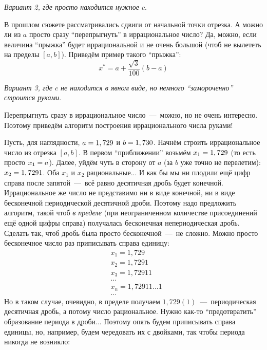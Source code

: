 \documentclass[a4paper,12pt]{article}
\begin{document}
\begin{solution}
    
    \emph{Вариант 2, где просто находится нужное $c$}.
    
    В прошлом сюжете рассматривались сдвиги от начальной точки отрезка.
    А можно ли из $a$ просто сразу ``перепрыгнуть'' в иррациональное число?
    Да, можно, если величина ``прыжка'' будет иррациональной и не очень большой (чтоб не вылететь на пределы $[a, b]$).
    Приведём пример такого ``прыжка'':
    \[
      x^* = a + \frac{\sqrt{3}}{100} (b - a)
    \]
    
    
    \emph{Вариант 3, где $c$ не находится в явном виде, но немного ``замороченно'' строится руками}.
    
    Перепрыгнуть сразу в иррациональное число~---~можно, но не очень интересно.
    Поэтому приведём алгоритм построения иррационального числа руками!
    
    Пусть, для наглядности, $a \hm= 1,729$ и $b \hm= 1,730$.
    Начнём строить иррациональное число из отрезка $[a, b]$.
    В первом ``приближении'' возьмём $x_1 \hm= 1,729$ (то есть просто $x_1 \hm= a$).
    Далее, уйдём чуть в сторону от $a$ (за $b$ уже точно не перелетим): $x_2 \hm= 1,7291$.
    Оба $x_1$ и $x_2$ рациональные...
    И как бы мы ни плодили ещё цифр справа после запятой~---~всё равно десятичная дробь будет конечной.
    Иррациональное же число не представимо ни в виде конечной, ни в виде бесконечной периодической десятичной дроби.
    Поэтому надо предложить алгоритм, такой чтоб \emph{в пределе} (при неограниченном количестве присоединений ещё одной цифры справа) получалась бесконечная непериодическая дробь.
    Сделать так, чтоб дробь была просто бесконечной~---~не сложно.
    Можно просто бесконечное число раз приписывать справа единицу:
    \[
      \begin{aligned}
        &x_1 = 1,729\\
        &x_2 = 1,7291\\
        &x_3 = 1,72911\\
        &\ldots\\
        &x_n = 1,72911 \ldots 1\\
        &\ldots
      \end{aligned}
    \]
    Но в таком случае, очевидно, в пределе получаем $1,729(1)$~---~периодическая десятичная дробь, а потому число рациональное.
    Нужно как-то ``предотвратить'' образование периода в дроби...
    Поэтому опять будем приписывать справа единицы, но, например, будем чередовать их с двойками, так чтобы периода никогда не возникло:
    \[
      \begin{aligned}

\end{aligned}\]
\end{solution}
\end{document}
